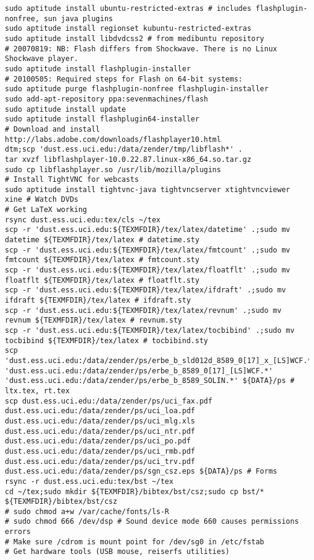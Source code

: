 \documentclass[12pt,twoside]{article}
\begin{document}
\begin{verbatim}
sudo aptitude install ubuntu-restricted-extras # includes flashplugin-nonfree, sun java plugins
sudo aptitude install regionset kubuntu-restricted-extras
sudo aptitude install libdvdcss2 # from medibuntu repository
# 20070819: NB: Flash differs from Shockwave. There is no Linux Shockwave player.
sudo aptitude install flashplugin-installer
# 20100505: Required steps for Flash on 64-bit systems:
sudo aptitude purge flashplugin-nonfree flashplugin-installer
sudo add-apt-repository ppa:sevenmachines/flash
sudo aptitude install update
sudo aptitude install flashplugin64-installer
# Download and install http://labs.adobe.com/downloads/flashplayer10.html
dtm;scp 'dust.ess.uci.edu:/data/zender/tmp/libflash*' .
tar xvzf libflashplayer-10.0.22.87.linux-x86_64.so.tar.gz
sudo cp libflashplayer.so /usr/lib/mozilla/plugins
# Install TightVNC for webcasts
sudo aptitude install tightvnc-java tightvncserver xtightvncviewer
xine # Watch DVDs
# Get LaTeX working
rsync dust.ess.uci.edu:tex/cls ~/tex
scp -r 'dust.ess.uci.edu:${TEXMFDIR}/tex/latex/datetime' .;sudo mv datetime ${TEXMFDIR}/tex/latex # datetime.sty
scp -r 'dust.ess.uci.edu:${TEXMFDIR}/tex/latex/fmtcount' .;sudo mv fmtcount ${TEXMFDIR}/tex/latex # fmtcount.sty
scp -r 'dust.ess.uci.edu:${TEXMFDIR}/tex/latex/floatflt' .;sudo mv floatflt ${TEXMFDIR}/tex/latex # floatflt.sty
scp -r 'dust.ess.uci.edu:${TEXMFDIR}/tex/latex/ifdraft' .;sudo mv ifdraft ${TEXMFDIR}/tex/latex # ifdraft.sty
scp -r 'dust.ess.uci.edu:${TEXMFDIR}/tex/latex/revnum' .;sudo mv revnum ${TEXMFDIR}/tex/latex # revnum.sty
scp -r 'dust.ess.uci.edu:${TEXMFDIR}/tex/latex/tocbibind' .;sudo mv tocbibind ${TEXMFDIR}/tex/latex # tocbibind.sty
scp 'dust.ess.uci.edu:/data/zender/ps/erbe_b_sld012d_8589_0[17]_x_[LS]WCF.*' 'dust.ess.uci.edu:/data/zender/ps/erbe_b_8589_0[17]_[LS]WCF.*' 'dust.ess.uci.edu:/data/zender/ps/erbe_b_8589_SOLIN.*' ${DATA}/ps # ltx.tex, rt.tex
scp dust.ess.uci.edu:/data/zender/ps/uci_fax.pdf dust.ess.uci.edu:/data/zender/ps/uci_loa.pdf dust.ess.uci.edu:/data/zender/ps/uci_mlg.xls dust.ess.uci.edu:/data/zender/ps/uci_ntr.pdf dust.ess.uci.edu:/data/zender/ps/uci_po.pdf dust.ess.uci.edu:/data/zender/ps/uci_rmb.pdf dust.ess.uci.edu:/data/zender/ps/uci_trv.pdf dust.ess.uci.edu:/data/zender/ps/sgn_csz.eps ${DATA}/ps # Forms
rsync -r dust.ess.uci.edu:tex/bst ~/tex
cd ~/tex;sudo mkdir ${TEXMFDIR}/bibtex/bst/csz;sudo cp bst/* ${TEXMFDIR}/bibtex/bst/csz
# sudo chmod a+w /var/cache/fonts/ls-R
# sudo chmod 666 /dev/dsp # Sound device mode 660 causes permissions errors
# Make sure /cdrom is mount point for /dev/sg0 in /etc/fstab
# Get hardware tools (USB mouse, reiserfs utilities)

\end{verbatim}
\end{document}
